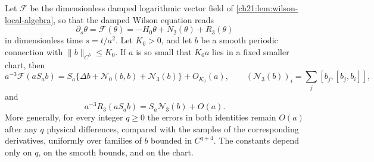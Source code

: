 \begin{lemma}\label{ch22:rem:full-smooth-coefficients}
Let $\mathcal F$ be the dimensionless damped logarithmic vector field of \cref{ch21:lem:wilson-local-algebra}, so that the damped Wilson equation reads
\[
 \partial_s\theta=\mathcal F(\theta)=-H_0\theta+N_2(\theta)+R_3(\theta)
\]
in dimensionless time $s=t/a^2$. Let $K_0>0$, and let $b$ be a smooth periodic connection with $\|b\|_{C^3}\le K_0$. If $a$ is so small that $K_0a$ lies in a fixed smaller chart, then
\[
 a^{-3}\mathcal F(aS_ab)=S_a\bigl\{\Delta b+\mathcal N_0(b,b)+\mathscr N_3(b)\bigr\}+O_{K_0}(a),
 \qquad (\mathscr N_3(b))_i=\sum_j[b_j,[b_j,b_i]],
\]
and
\[
 a^{-3}R_3(aS_ab)=S_a\mathscr N_3(b)+O(a).
\]
More generally, for every integer $q\ge0$ the errors in both identities remain $O(a)$ after any $q$ physical differences, compared with the samples of the corresponding derivatives, uniformly over families of $b$ bounded in $C^{q+4}$. The constants depend only on $q$, on the smooth bounds, and on the chart.
\end{lemma}

